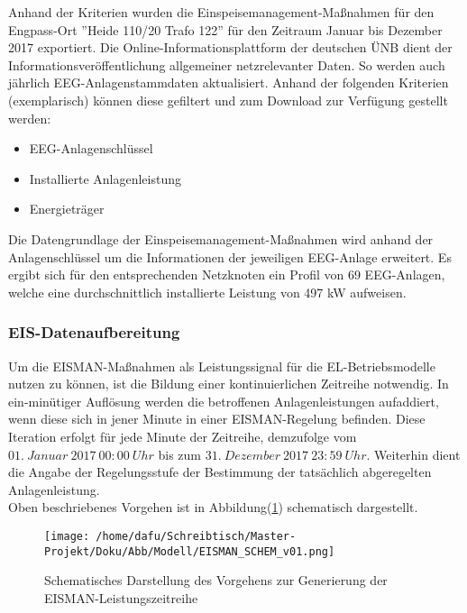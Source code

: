 \documentclass[onecolumn,10pt,titlepage]{article}
\begin{document}
Anhand der Kriterien wurden die Einspeisemanagement-Maßnahmen für den Engpass-Ort ''Heide 110/20 Trafo 122'' für den Zeitraum Januar bis Dezember 2017 exportiert.\newline
Die Online-Informationsplattform der deutschen ÜNB \cite{TennetTSOGmbH50hertzTransmissionGmbHAmprionGmbHTransnetBWGmbH.31.Januar2019} dient der Informationsveröffentlichung allgemeiner netzrelevanter Daten. So werden auch jährlich EEG-Anlagenstammdaten aktualisiert. Anhand der folgenden Kriterien (exemplarisch) können diese gefiltert und zum Download zur Verfügung gestellt werden: %
\begin{itemize}
	\item EEG-Anlagenschlüssel
	\item Installierte Anlagenleistung
	\item Energieträger
\end{itemize}

Die Datengrundlage der Einspeisemanagement-Maßnahmen wird anhand der Anlagenschlüssel um die Informationen der jeweiligen EEG-Anlage erweitert. Es ergibt sich für den entsprechenden Netzknoten ein Profil von 69 EEG-Anlagen, welche eine durchschnittlich installierte Leistung von 497 kW aufweisen.
\subsubsection{EIS-Datenaufbereitung}
Um die EISMAN-Maßnahmen als Leistungssignal für die EL-Betriebsmodelle nutzen zu können, ist die Bildung einer kontinuierlichen Zeitreihe notwendig. In ein-minütiger Auflösung werden die betroffenen Anlagenleistungen aufaddiert, wenn diese sich in jener Minute in einer EISMAN-Regelung befinden. Diese Iteration erfolgt für jede Minute der Zeitreihe, demzufolge vom $01. ~Januar ~2017 ~00:00 ~Uhr$ bis zum $31.~ Dezember~ 2017 ~23:59~ Uhr$. Weiterhin dient die Angabe der Regelungsstufe der Bestimmung der tatsächlich abgeregelten Anlagenleistung. \\
Oben beschriebenes Vorgehen ist in Abbildung(\ref{fig:EISMAN-Generierung}) schematisch dargestellt.
\begin{figure}[H]
	\centering
	\texttt{[image: /home/dafu/Schreibtisch/Master-Projekt/Doku/Abb/Modell/EISMAN\_SCHEM\_v01.png]}
	\caption[Schema: EISMAN-ZEitreihen GEnerierung]{Schematisches Darstellung des Vorgehens zur Generierung der EISMAN-Leistungszeitreihe}
	\label{fig:EISMAN-Generierung}
\end{figure}
\end{document}
